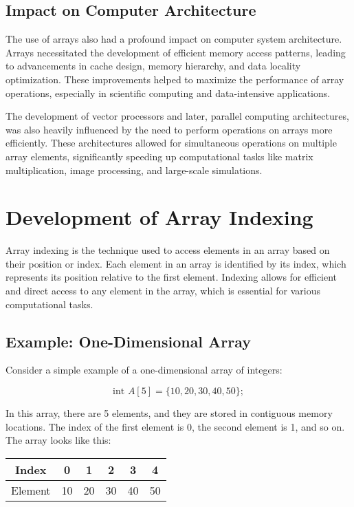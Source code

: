 \documentclass{book}
\begin{document}
	\subsection{Impact on Computer Architecture}
	
	The use of arrays also had a profound impact on computer system architecture. Arrays necessitated the development of efficient memory access patterns, leading to advancements in cache design, memory hierarchy, and data locality optimization. These improvements helped to maximize the performance of array operations, especially in scientific computing and data-intensive applications.
	
	The development of vector processors and later, parallel computing architectures, was also heavily influenced by the need to perform operations on arrays more efficiently. These architectures allowed for simultaneous operations on multiple array elements, significantly speeding up computational tasks like matrix multiplication, image processing, and large-scale simulations.
	
	\section{Development of Array Indexing}
	
	Array indexing is the technique used to access elements in an array based on their position or index. Each element in an array is identified by its index, which represents its position relative to the first element. Indexing allows for efficient and direct access to any element in the array, which is essential for various computational tasks.
	
	\subsection{Example: One-Dimensional Array}
	
	Consider a simple example of a one-dimensional array of integers:
	
	\[\text{int } A[5] = \{10, 20, 30, 40, 50\};\]
	
	In this array, there are 5 elements, and they are stored in contiguous memory locations. The index of the first element is 0, the second element is 1, and so on. The array looks like this:
	
	\begin{center}
    		\begin{tabular}{|c|c|c|c|c|c|}
			\hline
				Index & 0 & 1 & 2 & 3 & 4 \\
			\hline
			Element & 10 & 20 & 30 & 40 & 50 \\
			\hline
			\end{tabular}
	\end{center}
	
\end{document}
